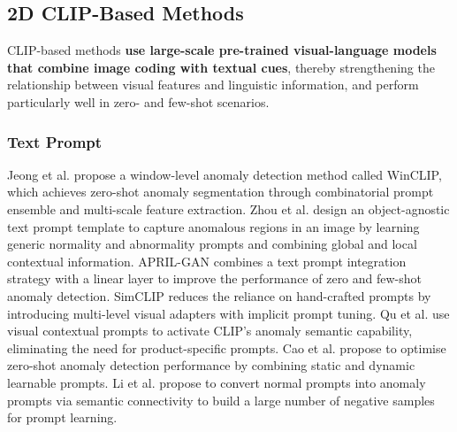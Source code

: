 \documentclass[journal,comsoc]{IEEEtran}
\begin{document}
\subsection{2D CLIP-Based Methods}
CLIP-based methods \textbf{use large-scale pre-trained visual-language models that combine image coding with textual cues}, thereby strengthening the relationship between visual features and linguistic information, and perform particularly well in zero- and few-shot scenarios.

\subsubsection{Text Prompt}
Jeong et al. \cite{jeong2023winclip} propose a window-level anomaly detection method called WinCLIP, which achieves zero-shot anomaly segmentation \cite{radford2021learning} through combinatorial prompt ensemble and multi-scale feature extraction. Zhou et al. \cite{zhou2023anomalyclip} design an object-agnostic text prompt template to capture anomalous regions in an image by learning generic normality and abnormality prompts \cite{zhou2022conditional} and combining global and local contextual information. APRIL-GAN \cite{chen2023april} combines a text prompt integration strategy with a linear layer \cite{ross2017focal,milletari2016v} to improve the performance of zero and few-shot anomaly detection. SimCLIP reduces the reliance on hand-crafted prompts by introducing multi-level visual adapters with implicit prompt tuning. Qu et al. \cite{qu2024vcp} use visual contextual prompts to activate CLIP's anomaly semantic capability, eliminating the need for product-specific prompts. Cao et al. \cite{cao2025adaclip} propose to optimise zero-shot anomaly detection performance by combining static and dynamic learnable prompts. Li et al. \cite{li2024promptad} propose to convert normal prompts into anomaly prompts via semantic connectivity to build a large number of negative samples for prompt learning.
\end{document}
